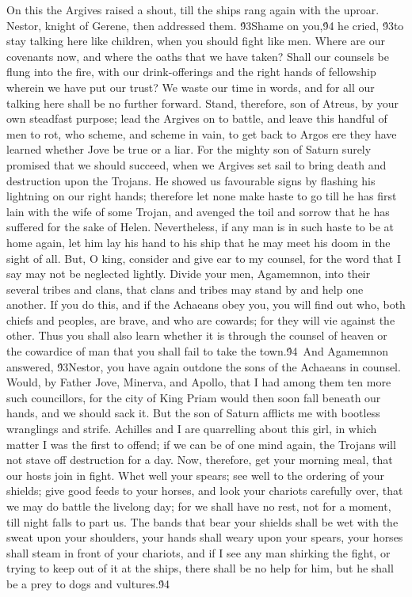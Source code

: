{On this the Argives raised a shout, till the ships rang again with the uproar. Nestor, knight of Gerene, then addressed them. \'93Shame on you,\'94 he cried, \'93to stay talking here like children, when you should fight like men. Where are our covenants now, and where the oaths that we have taken? Shall our counsels be flung into the fire, with our drink-offerings and the right hands of fellowship wherein we have put our trust? We waste our time in words, and for all our talking here shall be no further forward. Stand, therefore, son of Atreus, by your own steadfast purpose; lead the Argives on to battle, and leave this handful of men to rot, who scheme, and scheme in vain, to get back to Argos ere they have learned whether Jove be true or a liar. For the mighty son of Saturn surely promised that we should succeed, when we Argives set sail to bring death and destruction upon the Trojans. He showed us favourable signs by flashing his lightning on our right hands; therefore let none make haste to go till he has first lain with the wife of some Trojan, and avenged the toil and sorrow that he has suffered for the sake of Helen. Nevertheless, if any man is in such haste to be at home again, let him lay his hand to his ship that he may meet his doom in the sight of all. But, O king, consider and give ear to my counsel, for the word that I say may not be neglected lightly. Divide your men, Agamemnon, into their several tribes and clans, that clans and tribes may stand by and help one another. If you do this, and if the Achaeans obey you, you will find out who, both chiefs and peoples, are brave, and who are cowards; for they will vie against the other. Thus you shall also learn whether it is through the counsel of heaven or the cowardice of man that you shall fail to take the town.\'94\
And Agamemnon answered, \'93Nestor, you have again outdone the sons of the Achaeans in counsel. Would, by Father Jove, Minerva, and Apollo, that I had among them ten more such councillors, for the city of King Priam would then soon fall beneath our hands, and we should sack it. But the son of Saturn afflicts me with bootless wranglings and strife. Achilles and I are quarrelling about this girl, in which matter I was the first to offend; if we can be of one mind again, the Trojans will not stave off destruction for a day. Now, therefore, get your morning meal, that our hosts join in fight. Whet well your spears; see well to the ordering of your shields; give good feeds to your horses, and look your chariots carefully over, that we may do battle the livelong day; for we shall have no rest, not for a moment, till night falls to part us. The bands that bear your shields shall be wet with the sweat upon your shoulders, your hands shall weary upon your spears, your horses shall steam in front of your chariots, and if I see any man shirking the fight, or trying to keep out of it at the ships, there shall be no help for him, but he shall be a prey to dogs and vultures.\'94\
}
